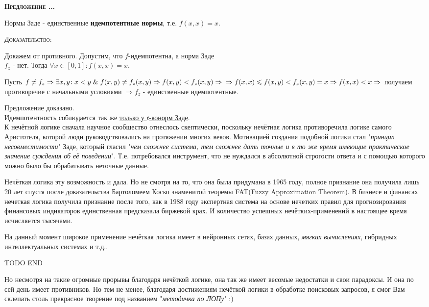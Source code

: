 \documentclass[18pt, a4paper]{extarticle}
\newcounter{par}
\newcounter{spar}
\newcounter{zap}
\newcommand{\predl}{\textbf{\textsc{Предложение \thepar.\if\thespar1\thespar.\fi\thezap.\;}}\stepcounter{zap}}
\newcommand{\dok}{\textsc{Доказательство:}}
\newcommand{\ampersand}{\;\&\;}
\begin{document}
\predl

Нормы Заде - единственные \textbf{идемпотентные нормы}, т.е. $f(x,x)=x$.  

\dok

Докажем от противного. Допустим, что $f$-идемпотентна, а норма Заде\\$f_z$ - нет. Тогда $\forall x\in[0,1]\!:f(x,x)=x$.

Пусть $f\neq f_z\Rightarrow\exists x,y\!: x<y\ampersand f(x,y)\neq f_z(x,y)\Rightarrow f(x,y)<f_z(x,y)\Rightarrow\newline\Rightarrow f(x,x)\leqslant f(x,y)<f_z(x,y)=x\Rightarrow f(x,x)<x\Rightarrow$ получаем противоречие с начальными условиями $\Rightarrow f_z$ - единственные идемпотентные.

Предложение доказано.\\

Идемпотентность соблюдается так же \underline{только у $t$-конорм Заде}.\\

К нечётной логике сначала научное сообщество отнеслось скептически, поскольку нечётная логика противоречила логике самого Аристотеля, которой люди руководствовались на протяжении многих веков. Мотивацией создания подобной логики стал "\textit{принцип несовместимости}"{} Заде, который гласил "\textit{чем сложнее система, тем сложнее дать точные и в то же время имеющие практическое значение суждения об её поведении}"{}. Т.е. потребовался инструмент, что не нуждался в абсолютной строгости ответа и с помощью которого можно было бы обрабатывать неточные данные.

Нечёткая логика эту возможность и дала. Но не смотря на то, что она была придумана в 1965 году, полное признание она получила лишь 20 лет спустя после доказательства Бартоломеем Коско знаменитой теоремы FAT(Fuzzy Approximation Theorem). В бизнесе и финансах нечеткая логика получила признание после того, как в 1988 году экспертная система на основе нечетких правил для прогнозирования финансовых индикаторов единственная предсказала биржевой крах. И количество успешных нечётких-применений в настоящее время исчисляется тысячами.

На данный момент широкое применение нечёткая логика имеет в нейронных сетях, базах данных, \textit{мягких вычислениях}, гибридных интеллектуальных системах и т.д..

TODO END

Но несмотря на такие огромные прорывы благодаря нечёткой логике, она так же имеет весомые недостатки и свои парадоксы. И она по сей день имеет противников. Но тем не менее, благодаря достижениям нечёткой логики в обработке поисковых запросов, я смог Вам склепать столь прекрасное творение под названием "\textit{методичка по ЛОПу}"{} :) \\\\
\end{document}
